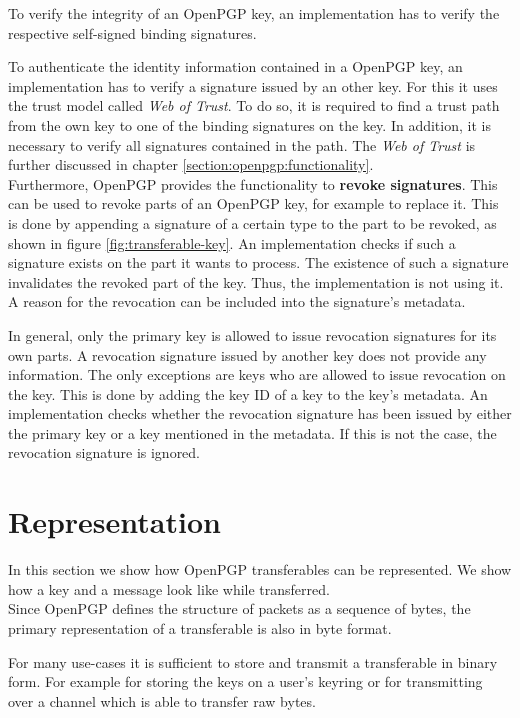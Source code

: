 To verify the integrity of an OpenPGP key, an implementation has to verify the respective self-signed binding signatures. 

To authenticate the identity information contained in a OpenPGP key, an implementation has to verify a signature issued by an other key. For this it uses the trust model called \textit{Web of Trust}. To do so, it is required to find a trust path from the own key to one of the binding signatures on the key. In addition, it is necessary to verify all signatures contained in the path. The \textit{Web of Trust} is further discussed in chapter \ref{section:openpgp:functionality}. \\

Furthermore, OpenPGP provides the functionality to \textbf{revoke signatures}. This can be used to revoke parts of an OpenPGP key, for example to replace it. This is done by appending a signature of a certain type to the part to be revoked, as shown in figure \ref{fig:transferable-key}. An implementation checks if such a signature exists on the part it wants to process. The existence of such a signature invalidates the revoked part of the key. Thus, the implementation is not using it. A reason for the revocation can be included into the signature's metadata. 

In general, only the primary key is allowed to issue revocation signatures for its own parts. A revocation signature issued by another key does not provide any information. The only exceptions are keys who are allowed to issue revocation on the key. This is done by adding the key ID of a key to the key's metadata. An implementation checks whether the revocation signature has been issued by either the primary key or a key mentioned in the metadata. If this is not the case, the revocation signature is ignored.

\section{Representation}
\label{section:messageformat:asciia}

In this section we show how OpenPGP transferables can be represented. We show how a key and a message look like while transferred. \\

Since OpenPGP defines the structure of packets as a sequence of bytes, the primary representation of a transferable is also in byte format.

For many use-cases it is sufficient to store and transmit a transferable in binary form. For example for storing the keys on a user's keyring or for transmitting over a channel which is able to transfer raw bytes. \\


